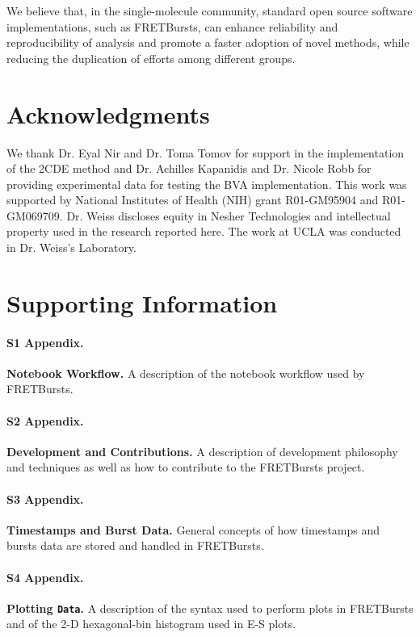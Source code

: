 \documentclass[10pt,letterpaper]{article}
\begin{document}
We believe that, in the single-molecule community,
standard open source software implementations, such as FRETBursts, can enhance
reliability and reproducibility of analysis and promote a faster adoption of novel methods,
while reducing the duplication of efforts among different groups.

\section*{Acknowledgments}
We thank Dr. Eyal Nir and Dr. Toma Tomov for support in the implementation of the 2CDE method and Dr. Achilles Kapanidis and Dr. Nicole Robb for providing 
experimental data for testing the BVA implementation.
This work was supported by National Institutes of Health (NIH)
grant R01-GM95904 and R01-GM069709. Dr. Weiss discloses equity in
Nesher Technologies and intellectual property used in the research
reported here. The work at UCLA was conducted in Dr. Weiss's Laboratory.

\section*{Supporting Information}


\paragraph*{S1 Appendix.}
\label{sec:notebook}
{\bf Notebook Workflow.} A description of the notebook workflow used by FRETBursts.

\paragraph*{S2 Appendix.}
\label{sec:dev}
{\bf Development and Contributions.} A description of development philosophy and techniques
as well as how to contribute to the FRETBursts project.

\paragraph*{S3 Appendix.}
\label{sec:burststimes}
{\bf Timestamps and Burst Data.} General concepts of how timestamps and
bursts data are stored and handled in FRETBursts.

\paragraph*{S4 Appendix.}
\label{sec:plotting}
{\bf Plotting \texttt{Data}.} A description of the syntax used to perform
plots in FRETBursts and of the 2-D hexagonal-bin histogram used in E-S plots.
\end{document}

